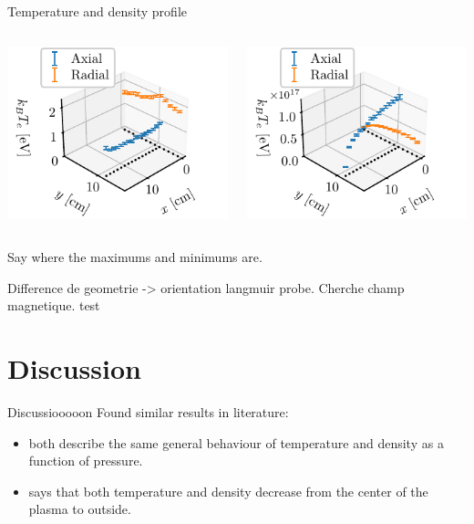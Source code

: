 \documentclass[10pt]{beamer}
\begin{document}
\begin{frame}{Temperature and density profile}
    \begin{columns}
        \centering
        {\includegraphics[scale=1]{../figures/temperatureEV_profile.pdf}}

        \centering
        {\includegraphics[scale=1]{../figures/density_profile.pdf}}

    \end{columns}
    Say where the maximums and minimums are.

    Difference de geometrie -> orientation langmuir probe. Cherche champ magnetique.
    test

\end{frame}


\section{Discussion}
\begin{frame}{Discussiooooon}
    Found similar results in literature: 
    \begin{itemize}
        \item {}  both describe the same general behaviour of temperature and density as a function of pressure.
        \item {} says that both temperature and density decrease from the center of the plasma to outside.
    \end{itemize}
\end{frame}
\end{document}
